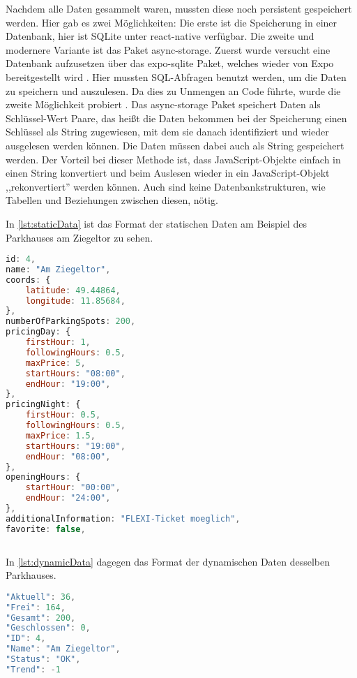 Nachdem alle Daten gesammelt waren, mussten diese noch persistent gespeichert werden. Hier gab es zwei Möglichkeiten: Die erste ist die Speicherung in einer Datenbank, hier ist SQLite unter react-native verfügbar. Die zweite und modernere Variante ist das Paket async-storage. Zuerst wurde versucht eine Datenbank aufzusetzen über das expo-sqlite Paket, welches wieder von Expo bereitgestellt wird \cite{expo-sqlite}. Hier mussten SQL-Abfragen benutzt werden, um die Daten zu speichern und auszulesen. Da dies zu Unmengen an Code führte, wurde die zweite Möglichkeit probiert \cite{async-storage}. Das async-storage Paket speichert Daten als Schlüssel-Wert Paare, das heißt die Daten bekommen bei der Speicherung einen Schlüssel als String zugewiesen, mit dem sie danach identifiziert und wieder ausgelesen werden können. Die Daten müssen dabei auch als String gespeichert werden. Der Vorteil bei dieser Methode ist, dass JavaScript-Objekte einfach in einen String konvertiert und beim Auslesen wieder in ein JavaScript-Objekt ,,rekonvertiert'' werden können. Auch sind keine Datenbankstrukturen, wie Tabellen und Beziehungen zwischen diesen, nötig.

In \autoref{lst:staticData} ist das Format der statischen Daten am Beispiel des Parkhauses am Ziegeltor zu sehen.

  \begin{lstlisting}[language=JavaScript, caption={Format der statischen Daten der Parkhäuser am Beispiel des Parkhauses am Ziegeltor}, label=lst:staticData]
id: 4,
name: "Am Ziegeltor",
coords: {
	latitude: 49.44864,
	longitude: 11.85684,
},
numberOfParkingSpots: 200,
pricingDay: {
	firstHour: 1,
	followingHours: 0.5,
	maxPrice: 5,
	startHours: "08:00",
	endHour: "19:00",
},
pricingNight: {
	firstHour: 0.5,
	followingHours: 0.5,
	maxPrice: 1.5,
	startHours: "19:00",
	endHour: "08:00",
},
openingHours: {
	startHour: "00:00",
	endHour: "24:00",
},
additionalInformation: "FLEXI-Ticket moeglich",
favorite: false,
	
\end{lstlisting}

In \autoref{lst:dynamicData} dagegen das Format der dynamischen Daten desselben Parkhauses.

  \begin{lstlisting}[language=JavaScript, caption={Format der dynamischen Daten der Parkhäuser am Beispiel des Parkhauses am Ziegeltor}, label=lst:dynamicData]
"Aktuell": 36,
"Frei": 164,
"Gesamt": 200,
"Geschlossen": 0,
"ID": 4,
"Name": "Am Ziegeltor",
"Status": "OK",
"Trend": -1
	
\end{lstlisting}

